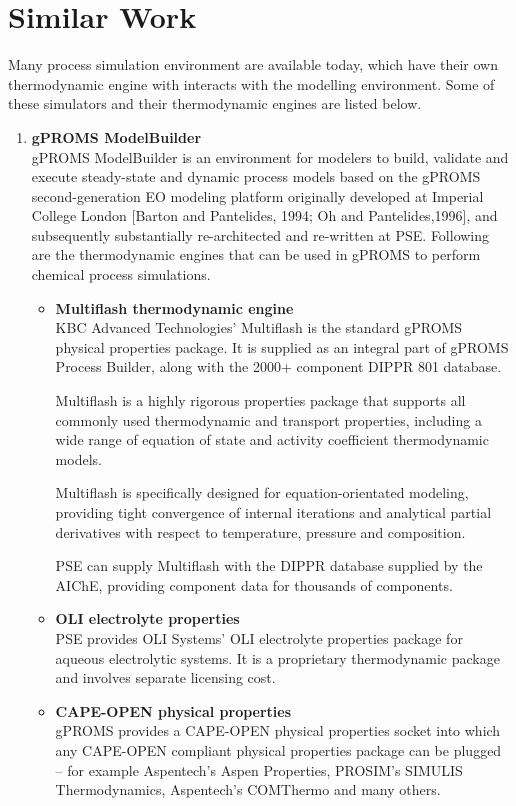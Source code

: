 \documentclass[12pt]{report}
\begin{document}
\chapter{Similar Work}
Many process simulation environment are available today, which have their own thermodynamic engine with interacts with the modelling environment. Some of these simulators and their thermodynamic engines are listed below.
\begin{enumerate}
\item{\textbf{gPROMS ModelBuilder}} \\
gPROMS ModelBuilder is an environment for modelers to build, validate and execute steady-state and dynamic process models based on the gPROMS second-generation EO modeling platform originally developed at Imperial College London [Barton and Pantelides, 1994; Oh and Pantelides,1996], and subsequently substantially re-architected and re-written at PSE. Following are the thermodynamic engines that can be used in gPROMS to perform chemical process simulations. \cite{GP}
\begin{itemize}
\item \textbf{Multiflash thermodynamic engine} \\
KBC Advanced Technologies' Multiflash is the standard gPROMS physical properties package. It is supplied as an integral part of gPROMS Process Builder, along with the 2000+ component DIPPR 801 database.

Multiflash is a highly rigorous properties package that supports all commonly used thermodynamic and transport properties, including a wide range of equation of state and activity coefficient thermodynamic models.

Multiflash is specifically designed for equation-orientated modeling, providing tight convergence of internal iterations and analytical partial derivatives with respect to temperature, pressure and composition.

PSE can supply Multiflash with the DIPPR database supplied by the AIChE, providing component data for thousands of components.

\item \textbf{OLI electrolyte properties} \\
PSE provides OLI Systems' OLI electrolyte properties package for aqueous electrolytic systems. It is a proprietary thermodynamic package and involves separate licensing cost.

\item \textbf{CAPE-OPEN physical properties} \\
gPROMS provides a CAPE-OPEN physical properties socket into which any CAPE-OPEN compliant physical properties package can be plugged – for example Aspentech's Aspen Properties, PROSIM's SIMULIS Thermodynamics, Aspentech's COMThermo and many others.


\end{itemize}
\end{enumerate}
\end{document}

